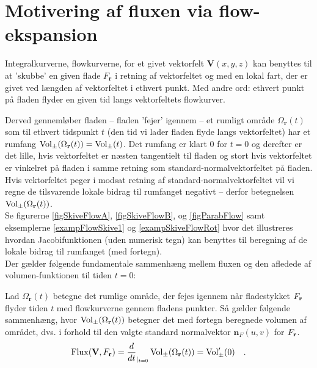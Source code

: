 

\section{Motivering af fluxen via flow-ekspansion}
Integralkurverne, flowkurverne,  for et givet vektorfelt $\mathbf{V}(x,y,z)$ kan benyttes til at
'skub\-be' en given flade $F_{\mathbf{r}}$ i retning af vektorfeltet og med en lokal
fart, der er givet ved længden af vektorfeltet i ethvert punkt. Med andre ord: ethvert punkt på fladen flyder en given tid langs vektorfeltets flowkurver.

Derved gennemløber fladen -- fladen 'fejer' igennem -- et rumligt område $\Omega_{\mathbf{r}}(t)$ som til ethvert tidspunkt
$t$ (den tid vi lader fladen flyde langs vektorfeltet) har et rumfang $\operatorname{Vol}_{\pm}(\Omega_{\mathbf{r}}(t)) = \operatorname{Vol}_{\pm}(t)$.
Det rumfang er klart $0$ for $t=0$ og derefter er det lille, hvis vektorfeltet er næsten
tangentielt til fladen og stort hvis vektorfeltet er vinkelret på fladen i samme retning som standard-normalvektorfeltet på fladen.
Hvis vektorfeltet peger i modsat retning af standard-normalvektorfeltet vil vi regne de tilsvarende lokale bidrag til rumfanget negativt -- derfor betegnelsen $\operatorname{Vol}_{\pm}(\Omega_{\mathbf{r}}(t))$. \\

Se figurerne \ref{figSkiveFlowA}, \ref{figSkiveFlowB}, og \ref{figParabFlow} samt eksemplerne \ref{exampFlowSkive1} og \ref{exampSkiveFlowRot} hvor det illustreres hvordan Jacobifunktionen (uden numerisk tegn) kan benyttes til beregning af de lokale bidrag til rumfanget (med fortegn).\\

Der gælder følgende fundamentale sammenhæng mellem fluxen og den afledede af volumen-funktionen til tiden $t=0$:

\begin{theorem} \label{thmFluxVolEkspand}
Lad $\Omega_{\mathbf{r}}(t)$ betegne det rumlige område, der fejes igennem når fladestykket $F_{\bf r}$ flyder tiden $t$ med flowkurverne gennem fladens punkter. Så gælder følgende sammenhæng, hvor $\operatorname{Vol}_{\pm}(\Omega_{\mathbf{r}}(t))$ betegner det med fortegn beregnede
volumen af området, dvs. i forhold til den valgte standard normalvektor $\mathbf{n}_{F}(u,v)$ for $F_{\bf r}$.
\begin{equation}
\operatorname{Flux}({\bf V}, F_{\bf r}) = \frac{d}{dt}_{|_{t=0}}\operatorname{Vol}_{\pm}(\Omega_{\mathbf{r}}(t)) = \operatorname{Vol}'_{\pm}(0) \quad.
\end{equation}
\end{theorem}




